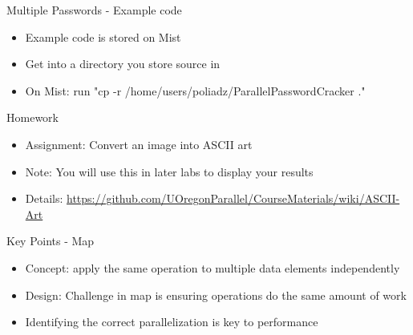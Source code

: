 \documentclass[xcolor=dvipsnames]{beamer}
\begin{document}
	\begin{frame}{Multiple Passwords - Example code}
		\begin{itemize}
      \item Example code is stored on Mist
      \item Get into a directory you store source in 
			\item On Mist: run "cp -r /home/users/poliadz/ParallelPasswordCracker ."
		\end{itemize}
	\end{frame}
	
  \begin{frame}{Homework}
	\begin{itemize}
		\item Assignment: Convert an image into ASCII art
		\item Note: You will use this in later labs to display your results
		\item Details: \href{https://github.com/UOregonParallel/CourseMaterials/wiki/ASCII-Art}{\url{https://github.com/UOregonParallel/CourseMaterials/wiki/ASCII-Art}}
	\end{itemize}
  \end{frame}
  
  \begin{frame}{Key Points - Map}
		\begin{itemize}
      \item Concept: apply the same operation to multiple data elements independently
      \item Design: Challenge in map is ensuring operations do the same amount of work
			\item Identifying the correct parallelization is key to performance
		\end{itemize}
	\end{frame}
	
\end{document}
